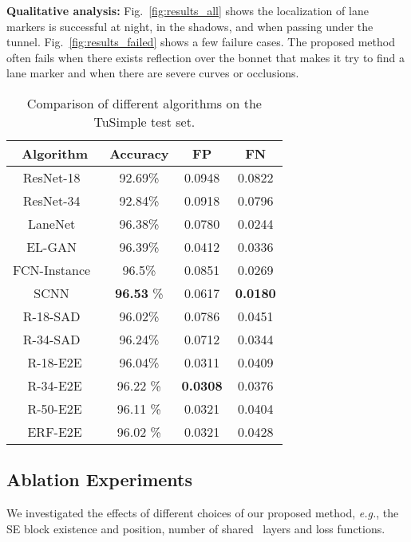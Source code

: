 \documentclass[10pt,twocolumn,letterpaper]{article}
\begin{document}
\textbf{Qualitative analysis:} Fig.~\ref{fig:results_all} shows the localization of lane markers is successful at night, in the shadows, and when passing under the tunnel.
Fig.~\ref{fig:results_failed} shows a few failure cases. The proposed method often fails when there exists reflection over the bonnet that makes it try to find a lane marker and when there are severe curves or occlusions.
\begin{table}[!t]
	\caption{Comparison of different algorithms on the TuSimple test set.}
	\label{tusimple_table}
	\vspace{5px}
	\centering
	\small{
		\begin{tabular}{c|c|c|c}
			\hline
			Algorithm & Accuracy & FP & FN \\
			\hline \hline
			ResNet-18~\cite{SAD} & 92.69\% & 0.0948 & 0.0822 \\
			ResNet-34~\cite{SAD} & 92.84\% & 0.0918 & 0.0796 \\
LaneNet~\cite{IV_Instance} & 96.38\% & 0.0780 & 0.0244 \\
EL-GAN~\cite{ElGAN} & 96.39\% & 0.0412 & 0.0336 \\
			FCN-Instance~\cite{Clustering} & 96.5\% & 0.0851 & 0.0269 \\
			SCNN~\cite{SpatialAsDeep} & \textbf{96.53} \% & 0.0617 & \textbf{0.0180} \\
			R-18-SAD~\cite{SAD} & 96.02\% & 0.0786 & 0.0451 \\
R-34-SAD~\cite{SAD} & 96.24\% & 0.0712 & 0.0344 \\
			\hline \hline
			R-18-E2E &  96.04\% & 0.0311 & 0.0409 \\
			R-34-E2E &  96.22 \% & \textbf{0.0308} & 0.0376 \\
			R-50-E2E &  96.11 \% & 0.0321 & 0.0404 \\
			ERF-E2E &  96.02 \% & 0.0321 & 0.0428 \\
			\hline
		\end{tabular}
	}
\end{table}


\subsection{Ablation Experiments}
We investigated the effects of different choices of our proposed method, \textit{e.g.}, the SE block existence and position, number of shared \reductionname\ layers and loss functions. 
\end{document}
